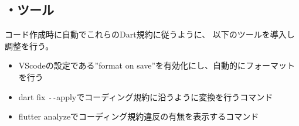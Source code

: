 \subsection*{・ツール}
コード作成時に自動でこれらのDart規約に従うように、
以下のツールを導入し調整を行う。\par
\begin{itemize}
  \item[-] VScodeの設定である”format on save”を有効化にし、自動的にフォーマットを行う
  \item[-] dart fix \verb|--|applyでコーディング規約に沿うように変換を行うコマンド
  \item[-] flutter analyzeでコーディング規約違反の有無を表示するコマンド
\end{itemize}

\clearpage
